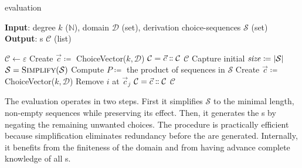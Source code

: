 \begin{algorithm}
    \caption{ evaluation}
    \label{alg:algo}
    \textbf{Input}:
    degree \(k\) (\(\mathbb{N}\)),
    domain \(\mathcal{D}\) (set),
    derivation choice-sequences \(\mathcal{S}\) (set)\\
    \textbf{Output}: s \(\mathcal{C}\) (list)
    \begin{algorithmic}[1]
        \State \(\mathcal{C} \gets \varepsilon \)
        \label{alg:step0}
            \State Create \(\vec{c} \coloneqq\) ChoiceVector(\(k, \mathcal{D}\))
            \State \(\mathcal{C} \gets \vec{c} \dblcolon\mathcal{C} \)
        \EndIf
        \State \Return \(\mathcal{C}\)\label{alg:step0end}
        \EndIf
        \Do \; Capture initial \(\text{\textit{size}} \coloneqq |\mathcal{S}|\)
        \State \(\mathcal{S} \gets \textsc{Simplify}(\mathcal{S})\)\label{alg:step1}
        \State Compute \(P \coloneqq\) the product of sequences in \(\mathcal{S}\)\label{alg:step2}
         
        \State Create \(\vec{c} \coloneqq\) ChoiceVector(\(k, \mathcal{D}\))
          
        \State Remove \(i\) at \(\vec{c}_j\)
        \EndFor
            \State \(\mathcal{C} \gets \vec{c} \dblcolon\mathcal{C} \)\label{alg:add}\label{alg:step2end}
        \EndIf
        \EndFor
        \State \Return \(\mathcal{C}\)
    \end{algorithmic}
\end{algorithm}

The evaluation operates in two steps. First it simplifies
\(\mathcal{S}\) to the minimal length, non-empty sequences while
preserving its effect. Then, it generates the s by negating
the remaining unwanted choices. The procedure is practically efficient because
simplification eliminates redundancy before the  are
generated. Internally, it benefits from the finiteness of the domain and from
having advance complete knowledge of all s.

